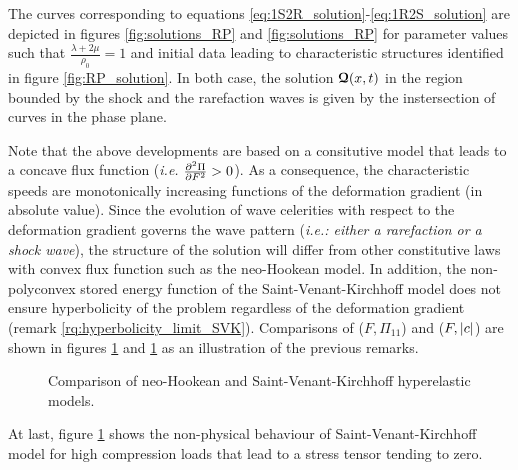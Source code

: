 The curves corresponding to equations \eqref{eq:1S2R_solution}-\eqref{eq:1R2S_solution} are depicted in figures \ref{fig:solutions_RP} and \ref{fig:solutions_RP} for parameter values such that $\frac{\lambda+2\mu}{\rho_0}=1$ and initial data leading to characteristic structures identified in figure \ref{fig:RP_solution}. In both case, the solution ${\boldsymbol{\mathcal{Q}}}(x,t)$ in the region bounded by the shock and the rarefaction waves is given by the instersection of curves in the phase plane. 

\begin{remark}
  Note that the above developments are based on a consitutive model that leads to a concave flux function (\textit{i.e. } $\ddrond{\Pi}{F}{F}>0$). As a consequence, the characteristic speeds are monotonically increasing functions of the deformation gradient (in absolute value). Since the evolution of wave celerities with respect to the deformation gradient governs the wave pattern (\textit{i.e.: either a rarefaction or a shock wave}), the structure of the solution will differ from other constitutive laws with convex flux function such as the neo-Hookean model. In addition, the non-polyconvex stored energy function of the Saint-Venant-Kirchhoff model does not ensure hyperbolicity of the problem regardless of the deformation gradient (remark \ref{rq:hyperbolicity_limit_SVK}). Comparisons of ($F,\Pi_{11}$) and ($F,\left\vert c\right\vert$) are shown in figures \ref{fig:SVK-NH} and \ref{fig:SVK-NH} as an illustration of the previous remarks.
  \begin{figure}[h!]
    \centering
    {  \label{subfig:SVK_NH_Pi}}
    {  \label{subfig:SVK_NH_speeds}}
    \caption{Comparison of neo-Hookean and Saint-Venant-Kirchhoff hyperelastic models.}
    \label{fig:SVK-NH}
  \end{figure}
  At last, figure \ref{fig:SVK-NH} shows the non-physical behaviour of Saint-Venant-Kirchhoff model for high compression loads that lead to a stress tensor tending to zero.
\end{remark}

